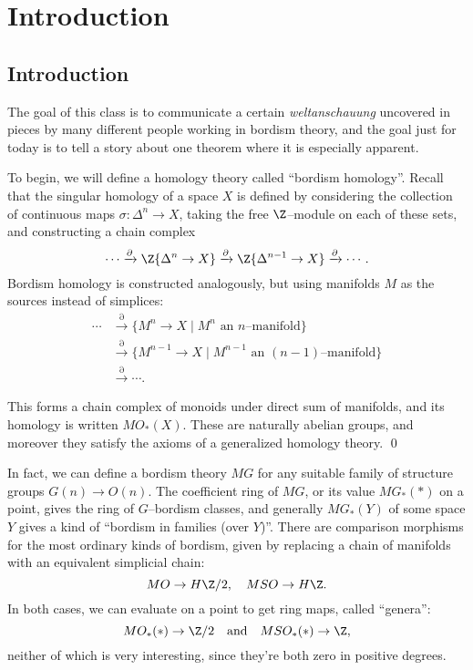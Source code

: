 
\setcounter{chapter}{-1}
\chapter{Introduction}

\section{Introduction}\label{IntroductionSection}

The goal of this class is to communicate a certain \textit{weltanschauung} uncovered in pieces by many different people working in bordism theory, and the goal just for today is to tell a story about one theorem where it is especially apparent.

To begin, we will define a homology theory called ``bordism homology''.  Recall that the singular homology of a space $X$ is defined by considering the collection of continuous maps $\sigma: \Delta^n \to X$, taking the free $\Z$--module on each of these sets, and constructing a chain complex \[\cdots \xrightarrow{\partial} \Z\{\Delta^n \to X\} \xrightarrow{\partial} \Z\{\Delta^{n-1} \to X\} \xrightarrow{\partial} \cdots.\]  Bordism homology is constructed analogously, but using manifolds $M$ as the sources instead of simplices:
\begin{align*}
\cdots & \xrightarrow{\partial} \{M^n \to X \mid \text{$M^n$ an $n$--manifold}\} \\
& \xrightarrow{\partial} \{M^{n-1} \to X \mid \text{$M^{n-1}$ an $(n-1)$--manifold}\} \\
& \xrightarrow{\partial} \cdots.
\end{align*}

\begin{lemma}
This forms a chain complex of monoids under direct sum of manifolds, and its homology is written $MO_*(X)$.  These are naturally abelian groups, and moreover they satisfy the axioms of a generalized homology theory. \qed
\end{lemma}

In fact, we can define a bordism theory $MG$ for any suitable family of structure groups $G(n) \to O(n)$.  The coefficient ring of $MG$, or its value $MG_*(*)$ on a point, gives the ring of $G$--bordism classes, and generally $MG_*(Y)$ of some space $Y$ gives a kind of ``bordism in families (over $Y$)''.  There are comparison morphisms for the most ordinary kinds of bordism, given by replacing a chain of manifolds with an equivalent simplicial chain: \[MO \to H\Z/2, \quad MSO \to H\Z.\] In both cases, we can evaluate on a point to get ring maps, called ``genera'': \[MO_*(*) \to \Z/2 \quad \text{and} \quad MSO_*(*) \to \Z,\] neither of which is very interesting, since they're both zero in positive degrees.

